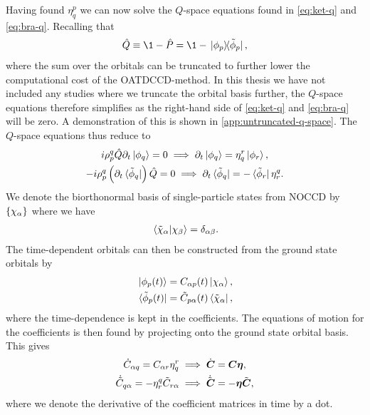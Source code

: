             Having found $\eta^{p}_{q}$ we can now solve the $Q$-space
            equations found in \autoref{eq:ket-q} and \autoref{eq:bra-q}.
            Recalling that
            \begin{align}
                \hat{Q} \equiv \1 - \hat{P}
                = \1 - \dyad*{\phi_p}{\tilde{\phi}_p},
            \end{align}
            where the sum over the orbitals can be truncated to further lower
            the computational cost of the OATDCCD-method.
            In this thesis we have not included any studies where we truncate
            the orbital basis further, the $Q$-space equations therefore
            simplifies as the right-hand side of \autoref{eq:ket-q} and
            \autoref{eq:bra-q} will be zero.
            A demonstration of this is shown in
            \autoref{app:untruncated-q-space}.
            The $Q$-space equations thus reduce to
            \begin{gather}
                i\rho^{q}_{p}\hat{Q}\partial_t\ket*{\phi_q} = 0
                \implies
                \partial_t\ket*{\phi_q}
                = \eta^{r}_{q}\ket*{\phi_r},
                \\
                -i\rho^{q}_{p}\left( 
                    \partial_t\bra*{\tilde{\phi}_q}
                 \right)\hat{Q}
                = 0
                \implies
                \partial_t\bra*{\tilde{\phi}_q}
                = -\bra*{\tilde{\phi}_r}\eta^{q}_{r}.
            \end{gather}
            We denote the biorthonormal basis of single-particle states from
            NOCCD by $\left\{ \chi_{\alpha} \right\}$ where we have
            \begin{align}
                \braket*{\tilde{\chi}_{\alpha}}{\chi_{\beta}}
                = \delta_{\alpha \beta}.
            \end{align}
            The time-dependent orbitals can then be constructed from the ground
            state orbitals by
            \begin{gather}
                \ket*{\phi_p(t)}
                = C_{\alpha p}(t) \ket*{\chi_{\alpha}},
                \\
                \bra*{\tilde{\phi}_p(t)}
                = \tilde{C}_{p \alpha}(t) \bra*{\tilde{\chi}_{\alpha}},
            \end{gather}
            where the time-dependence is kept in the coefficients.
            The equations of motion for the coefficients is then found by
            projecting onto the ground state orbital basis.
            This gives
            \begin{gather}
                \dot{C}_{\alpha q} = C_{\alpha r} \eta^{r}_{q}
                \implies
                \dot{\boldsymbol{C}} = \boldsymbol{C} \boldsymbol{\eta},
                \\
                \dot{\tilde{C}}_{q \alpha}
                = -\eta^{q}_{r} \tilde{C}_{r \alpha}
                \implies
                \dot{\tilde{\boldsymbol{C}}}
                = -\boldsymbol{\eta} \tilde{\boldsymbol{C}},
            \end{gather}
            where we denote the derivative of the coefficient matrices in time
            by a dot.

